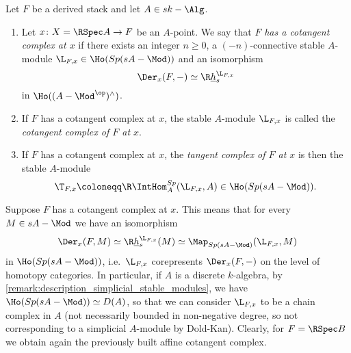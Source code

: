         \begin{defn}
            \label{defn:cotangent_complex_existence}
            Let $F$ be a derived stack and let $A \in sk-\Alg$.
            \begin{enumerate}
                \item Let $x\colon X = \RSpec A \to F$ be an $A$-point. We say that $F$ \emph{has a cotangent complex at $x$} if there exists an integer $n \geq 0$, a $(-n)$-connective stable $A$-module $\L_{F, x} \in \Ho(Sp(sA-\Mod))$ and an isomorphism \[\Der_x(F, -) \simeq \R\underline{h}_s^{\L_{F, x}} \] in $\Ho((A-\Mod^{\op})^{\wedge})$. 
                \item If $F$ has a cotangent complex at $x$, the stable $A$-module $\L_{F, x}$ is called the \emph{cotangent complex of $F$ at $x$}.
                \item If $F$ has a cotangent complex at $x$, the \emph{tangent complex of $F$ at $x$} is then the stable $A$-module \[\T_{F, x} \coloneqq \R\IntHom_A^{Sp}(\L_{F, x}, A) \in \Ho(Sp(sA-\Mod)). \]
            \end{enumerate}
        \end{defn}
        Suppose $F$ has a cotangent complex at $x$. This means that for every $M \in sA-\Mod$ we have an isomorphism \[\Der_x(F, M) \simeq \R\underline{h}_s^{\L_{F, x}}(M) \simeq \Map_{Sp(sA-\Mod)}(\L_{F, x}, M) \] in $\Ho(Sp(sA-\Mod))$, i.e.\ $\L_{F, x}$ corepresents $\Der_x(F, -)$ on the level of homotopy categories.
        In particular, if $A$ is a discrete $k$-algebra, by \cref{remark:description_simplicial_stable_modules}, we have $\Ho(Sp(sA-\Mod)) \simeq D(A)$, so that we can consider $\L_{F, x}$ to be a chain complex in $A$ (not necessarily bounded in non-negative degree, so not corresponding to a simplicial $A$-module by Dold-Kan).
        Clearly, for $F = \RSpec B$ we obtain again the previously built affine cotangent complex.


